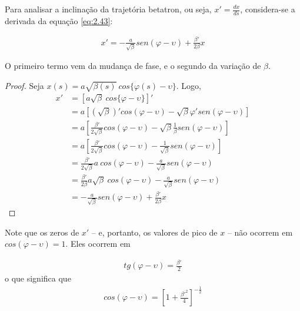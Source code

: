 Para analisar a inclinação da trajetória betatron, ou seja, $x'=\frac{dx}{ds}$, considera-se a derivada da equação \eqref{eq:2.43}:
	
\begin{align}
	x' = - \frac{a}{\sqrt{\beta}}sen(\varphi-\upsilon)+\frac{\beta'}{2\beta}x\label{eq:2.52}
\end{align}
	
O primeiro termo vem da mudança de fase, e o segundo da variação de $\beta$.
	
\begin{proof}
	Seja $x(s) = a\sqrt{\beta(s)}\ cos\{\varphi(s)-\upsilon\}$. Logo, 
	\begin{align*}
      x' &= [a\sqrt{\beta}\ cos\{\varphi-\upsilon\}]'\\
         &= a[(\sqrt{\beta})'cos(\varphi-\upsilon)-\sqrt{\beta}\varphi'sen(\varphi-\upsilon)]\\
      	 &= a\left[\frac{\beta'}{2\sqrt{\beta}}cos(\varphi-\upsilon)-\sqrt{\beta}\frac{1}{\beta}sen(\varphi-\upsilon)\right]\\
      	 &= a\left[\frac{\beta'}{2\sqrt{\beta}}cos(\varphi-\upsilon)-\frac{1}{\sqrt{\beta}}sen(\varphi-\upsilon)\right]\\
      	 &= \frac{\beta'}{2\sqrt{\beta}}a\ cos(\varphi-\upsilon)-\frac{a}{\sqrt{\beta}}sen(\varphi-\upsilon)\\
      	 &= \frac{\beta'}{2\beta}a\sqrt{\beta}\ cos(\varphi-\upsilon)-\frac{a}{\sqrt{\beta}}sen(\varphi-\upsilon)\\
      	 &= -\frac{a}{\sqrt{\beta}}sen(\varphi-\upsilon)+\frac{\beta'}{2\beta}x
	\end{align*}
\end{proof}
	
Note que os zeros de $x'$ -- e, portanto, os valores de pico de $x$ -- não ocorrem em $cos(\varphi-\upsilon)=1$. Eles ocorrem em
	
\begin{align}
	tg(\varphi-\upsilon) = \frac{\beta'}{2}
\end{align}
o que significa que
\begin{align}
	cos(\varphi-\upsilon) = \left[1+\frac{\beta'^2}{4}\right]^{-\frac{1}{2}}
\end{align}
	
